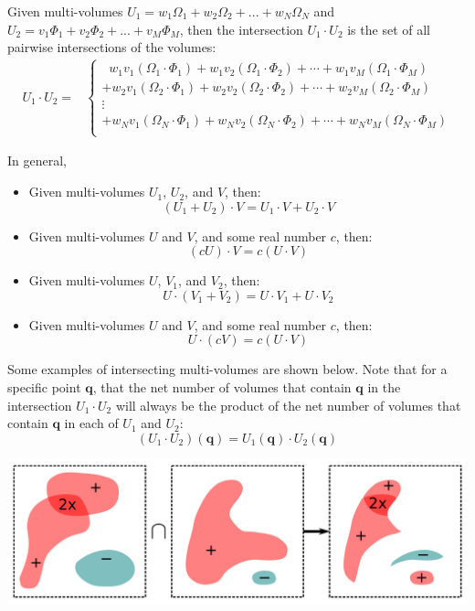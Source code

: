 Given multi-volumes \(U_1 = w_1\Omega_1 + w_2\Omega_2 + ... + w_N\Omega_N\) and \\ \(U_2 = v_1\Phi_1 + v_2\Phi_2 + ... + v_M\Phi_M\), then the intersection \(U_1 \cdot U_2\) is the set of all pairwise intersections of the volumes:
\begin{align*}
U_1 \cdot U_2 = & \left\{\begin{array}{c}
\;\; w_1 v_1 (\Omega_1 \cdot \Phi_1) + w_1 v_2 (\Omega_1 \cdot \Phi_2) + \cdots + w_1 v_M (\Omega_1 \cdot \Phi_M) \\ 
+ w_2 v_1 (\Omega_2 \cdot \Phi_1) + w_2 v_2 (\Omega_2 \cdot \Phi_2) + \cdots + w_2 v_M (\Omega_2 \cdot \Phi_M) \\ 
\vdots \\
+ w_N v_1 (\Omega_N \cdot \Phi_1) + w_N v_2 (\Omega_N \cdot \Phi_2) + \cdots + w_N v_M (\Omega_N \cdot \Phi_M) \\ 
\end{array}\right.
\end{align*}

In general,
\begin{itemize}
\item Given multi-volumes \(U_1\), \(U_2\), and \(V\), then:
\[(U_1 + U_2) \cdot V = U_1 \cdot V + U_2 \cdot V\] 
\item Given multi-volumes \(U\) and \(V\), and some real number \(c\), then:
\[(cU) \cdot V = c(U \cdot V)\]
\item Given multi-volumes \(U\), \(V_1\), and \(V_2\), then:
\[U \cdot (V_1 + V_2) = U \cdot V_1 + U \cdot V_2\] 
\item Given multi-volumes \(U\) and \(V\), and some real number \(c\), then:
\[U \cdot (cV) = c(U \cdot V)\]
\end{itemize}

Some examples of intersecting multi-volumes are shown below. Note that for a specific point \(\mathbf{q}\), that the net number of volumes that contain \(\mathbf{q}\) in the intersection \(U_1 \cdot U_2\) will always be the product of the net number of volumes that contain \(\mathbf{q}\) in each of \(U_1\) and \(U_2\):
\[(U_1 \cdot U_2)(\mathbf{q}) = U_1(\mathbf{q}) \cdot U_2(\mathbf{q})\]

\begin{center}
\includegraphics[width = \textwidth]{Intersections/Volume-volume_intersections/volume_volume_intersections_three_panel_example}
\end{center}

